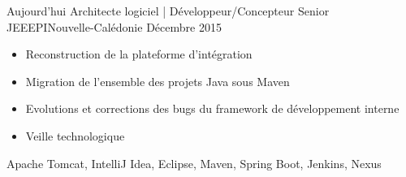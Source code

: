%
%
%


\begin{experiences}
	\experience
	{Aujourd'hui}   {Architecte logiciel | Développeur/Concepteur Senior JEE}{EPI}{Nouvelle-Calédonie}
	{Décembre 2015} {
		\begin{itemize}
			\item Reconstruction de la plateforme d'intégration
			\item Migration de l'ensemble des projets Java sous Maven
			\item Evolutions et corrections des bugs du framework de développement interne
			\item Veille technologique
		\end{itemize}
	}
	{Apache Tomcat, IntelliJ Idea, Eclipse, Maven, Spring Boot, Jenkins, Nexus}
	\emptySeparator
\end{experiences}